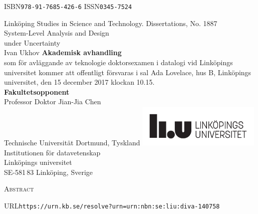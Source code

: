 \documentclass[a4paper,oneside,showtrims]{memoir}
\newcommand{\adjustlayout}{
  \setlength{\trimtop}{\stockheight}
  \addtolength{\trimtop}{-\paperheight}
  \setlength{\trimedge}{\stockwidth}
  \addtolength{\trimedge}{-\paperwidth}
  \settrims{0.5\trimtop}{0.5\trimedge}
  \setlrmargins{*}{*}{*}
  \setulmargins{2cm}{*}{*}
}
\begin{document}
  \adjustlayout
  \checkandfixthelayout
  \pagestyle{empty}
    {ISBN\hspace{0.5em}\texttt{978-91-7685-426-6}}{}
    {ISSN\hspace{0.5em}\texttt{0345-7524}}
  \thispagestyle{plain}
  \begin{center}
    {
      Linköping Studies in Science and Technology. Dissertations, No. 1887
    }\\[6em]
    {
      \headingfont
      \Huge
      System-Level Analysis and Design\\[0.2em]
      under Uncertainty
    }\\[3em]
    {
      \headingfont
      \huge
      Ivan Ukhov
    }
    \vfill
    {
      \textbf{Akademisk avhandling}\\[0.5em]
      som för avläggande av teknologie doktorsexamen i datalogi vid Linköpings
      universitet kommer att offentligt försvaras i sal Ada Lovelace, hus B,
      Linköpings universitet, den 15 december 2017 klockan 10.15.
    }\\[2em]
    {
      \textbf{Fakultetsopponent}\\[0.5em]
      Professor Doktor Jian-Jia Chen\\
      Technische Universität Dortmund, Tyskland
    }
    \vfill
    \includegraphics[height=5.5em]{include/assets/layout/logo-swedish}\\[2em]
    {
      Institutionen för datavetenskap\\
      Linköpings universitet\\
      SE-581\,83 Linköping, Sverige
    }
  \end{center}
  \clearpage
  {
    \centerline{\Large\textsc{Abstract}}
    \vspace{1em}
    \noindent
    
  }
  \vfill
  \noindent
  URL\hspace{0.5em}\texttt{https://urn.kb.se/resolve?urn=urn:nbn:se:liu:diva-140758}
\end{document}
